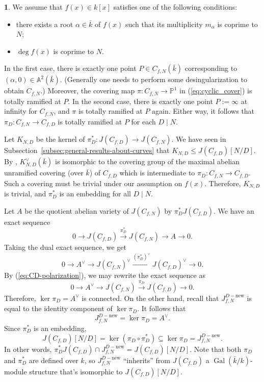 \documentclass{amsart}[11pt]
\theoremstyle{definition}
\newtheorem{sect}[thm]{}
\numberwithin{equation}{section}
\theoremstyle{notitle}
\begin{document}
\begin{sect}\label{sec:connectedness-of-the-kernel}
  We assume that $f(x)\in k[x]$ satisfies one of the following
  conditions:
\begin{itemize}
\item there exists a root $\alpha\in \bar{k}$ of $f(x)$ such that its
  multiplicity $m_\alpha$ is coprime to $N$;
\item $\deg f(x)$ is coprime to $N$. 
\end{itemize}
In the first case, there is exactly one point $P\in C_{f,N}(\bar{k})$
corresponding to $(\alpha, 0)\in \mathbb{A}^2({\bar{k}})$. (Generally
one needs to perform some desingularization to obtain $C_{f,N}$.)
Moreover, the covering map $\pi: C_{f,N}\to {\mathbb{P}}^1$ in
(\ref{eq:cyclic_cover}) is totally ramified at $P$. In the second
case, there is exactly one point $P:=\infty$ at infinity for $C_{f,N}$, and
$\pi$ is totally ramified at $P$ again. Either way, it follows that
$\pi_D: C_{f,N}\to C_{f,D}$ is totally ramified at $P$ for each $D\mid
N$.  

Let $K_{N,D}$ be the kernel of $\pi_D^*: J(C_{f,D})\to J(C_{f,N})$. We
have seen in Subsection~\ref{subsec:general-results-about-curves} that
$K_{N,D}\leq J(C_{f,D})[N/D]$. By \cite[Section 9]{MR861976},
$K_{N,D}^\vee(\bar{k})$ is isomorphic to the covering group of the
maximal abelian unramified covering (over $\bar{k}$) of $C_{f,D}$
which is intermediate to $\pi_D: C_{f,N}\to C_{f,D}$.  Such a
covering must be trivial under our assumption on $f(x)$. Therefore,
$K_{N,D}$ is trivial, and $\pi_D^*$ is an embedding for all $D\mid
N$. 

Let $A$ be the quotient abelian variety of $J(C_{f,N})$ by
$\pi_D^*J(C_{f,D})$. We have an exact sequence 
\[  0\to J(C_{f,D})\xrightarrow{\pi_D^*}  J(C_{f,N})\to A\to 0. \]
Taking the dual exact sequence, we get
\[ 0 \to A^\vee \to J(C_{f,N})^\vee \xrightarrow{(\pi_D^*)^\vee}
J(C_{f,D})^\vee \to 0.\] By (\ref{eq:CD-polarization}), we may rewrite
the exact sequence as
\[ 0 \to A^\vee \to J(C_{f,N})\xrightarrow{\pi_D} J(C_{f,D}) \to 0.\]
Therefore, $\ker\pi_D=A^\vee$ is connected.  On the other hand, recall
that $J_{f,N}^{D-{\mathrm{new}}}$ is equal to the identity component of $\ker
\pi_D$. It follows that
\begin{equation}
  \label{eq:kernel-connected}
  J_{f,N}^{D-{\mathrm{new}}}=\ker \pi_D=A^\vee.
\end{equation}
Since $\pi_D^*$ is an embedding,
\begin{equation}
  \label{eq:torsion-inherence}
 J(C_{f,D})[N/D]= \ker (\pi_D\circ \pi_D^*)\subseteq \ker
\pi_D=J_{f,N}^{D-{\mathrm{new}}}. 
\end{equation}
In other words, $\pi_D^* J(C_{f,D})\cap J_{f,N}^{D-{\mathrm{new}}}= J(C_{f,D})[N/D]$.
Note that both $\pi_D$ and $\pi_D^*$ are defined over $k$, so
$J_{f,N}^{D-{\mathrm{new}}}$ ``inherits'' from $J(C_{f,D})$ a
$\operatorname{Gal}(\bar{k}/k)$-module structure that's isomorphic to
$J(C_{f,D})[N/D]$.


\end{sect}
\end{document}
